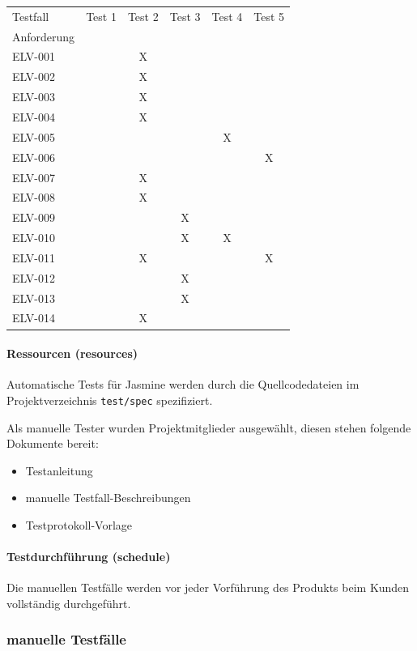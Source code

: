 \begin{tabular}{l|ccccc}
Testfall 	& Test 1 	& Test 2 	& Test 3 	& Test 4 	& Test 5 \\
Anforderung &&&&& \\ \hline
ELV-001 	& 			& X			& 			&			&		\\
ELV-002 	& 			& X			& 			&			&		\\
ELV-003 	& 			& X			& 			&			&		\\
ELV-004 	& 			& X			& 			&			&		\\
ELV-005 	& 			& 			& 			&	X		&		\\
ELV-006 	& 			& 			& 			&			&	X	\\
ELV-007 	& 			& X			& 			&			&		\\
ELV-008 	& 			& X			& 			&			&		\\
ELV-009 	& 			& 			& X			&			&		\\
ELV-010 	& 			& 			& X			&	X		&		\\
ELV-011 	& 			& X			& 			&			&	X	\\
ELV-012 	& 			& 			& X			&			&		\\
ELV-013 	& 			& 			& X			&			&		\\
ELV-014 	& 			& X			& 			&			&		\\
\end{tabular}


\paragraph{Ressourcen (resources)}
Automatische Tests für Jasmine werden durch die Quellcodedateien im Projektverzeichnis \texttt{test/spec} spezifiziert.

Als manuelle Tester wurden Projektmitglieder ausgewählt, diesen stehen folgende Dokumente bereit:
\begin{itemize}
	\item Testanleitung
	\item manuelle Testfall-Beschreibungen
	\item Testprotokoll-Vorlage
\end{itemize}

\paragraph{Testdurchführung (schedule)}
Die manuellen Testfälle werden vor jeder Vorführung des Produkts beim Kunden vollständig durchgeführt.

\newpage
\subsubsection{manuelle Testfälle}\label{QS:Test:Manuelle_Testfaelle}
